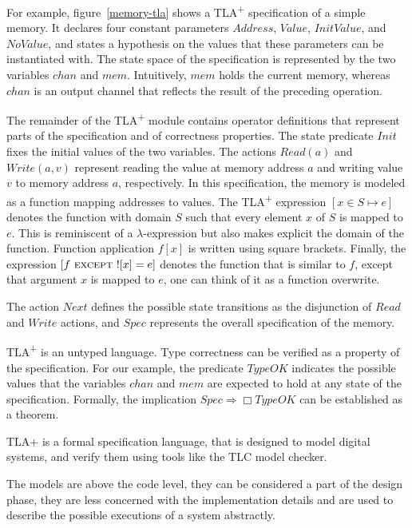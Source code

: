 \documentclass{thesul}
\newcommand{\tlaplus}{TLA\textsuperscript{+}\xspace}
\newcommand{\EXCEPT}{\textsc{except}}
\begin{document}
For example, figure~\ref{memory-tla} shows a \tlaplus specification of a simple memory. It declares four constant parameters $Address$, $Value$, $InitValue$, and $NoValue$, and states a hypothesis on the values that these parameters can be instantiated with. The state space of the specification is represented by the two variables $chan$ and $mem$. Intuitively, $mem$ holds the current memory, whereas $chan$ is an output channel that reflects the result of the preceding operation.

The remainder of the \tlaplus module contains operator definitions that represent parts of the specification and of correctness properties. The state predicate $Init$ fixes the initial values of the two variables. The actions $Read(a)$ and $Write(a,v)$ represent reading the value at memory address $a$ and writing value $v$ to memory address $a$, respectively. In this specification, the memory is modeled as a function mapping addresses to values. The \tlaplus expression $[x \in S \mapsto e]$ denotes the function with domain $S$ such that every element $x$ of $S$ is mapped to $e$. This is reminiscent of a $\lambda$-expression but also makes explicit the domain of the function. Function application $f[x]$ is written using square brackets. Finally, the expression $[f\ \EXCEPT\ ![x] = e]$ denotes the function that is similar to $f$, except that argument $x$ is mapped to $e$, one can think of it as a function overwrite.

The action $Next$ defines the possible state transitions as the disjunction of $Read$ and $Write$ actions, and $Spec$ represents the overall specification of the memory.

\tlaplus is an untyped language. Type correctness can be verified as a property of the specification. For our example, the predicate $TypeOK$ indicates the possible values that the variables $chan$ and $mem$ are expected to hold at any state of the specification. Formally, the implication $Spec \Rightarrow \Box TypeOK$ can be established as a theorem.

\bigskip

TLA+ is a formal specification language, that is designed to model digital systems, and verify them using tools like the TLC model checker.

The models are above the code level, they can be considered a part of the design phase, they are less concerned with the implementation details and are used to describe the possible executions of a system abstractly.
\end{document}
